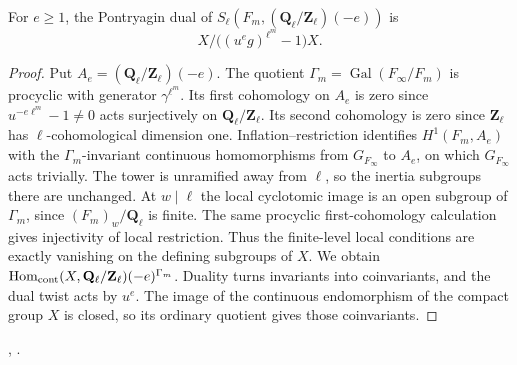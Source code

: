 \begin{lemma}\label{newcoh:desc}
For \(e\ge1\), the Pontryagin dual of
\(S_\ell(F_m,(\mathbf Q_\ell/\mathbf Z_\ell)(-e))\) is
\[
 X\big/\big((u^eg)^{\ell^m}-1\big)X .
\]
\end{lemma}
\begin{proof}
Put \(A_e=(\mathbf Q_\ell/\mathbf Z_\ell)(-e)\).
The quotient \(\Gamma_m=\operatorname{Gal}(F_\infty/F_m)\) is
procyclic with generator \(\gamma^{\ell^m}\). Its first cohomology on
\(A_e\) is zero since \(u^{-e\ell^m}-1\ne0\) acts surjectively on
\(\mathbf Q_\ell/\mathbf Z_\ell\). Its second cohomology is zero since
\(\mathbf Z_\ell\) has \(\ell\)-cohomological dimension one.
Inflation--restriction identifies \(H^1(F_m,A_e)\) with the
\(\Gamma_m\)-invariant continuous homomorphisms from \(G_{F_\infty}\)
to \(A_e\), on which \(G_{F_\infty}\) acts trivially.
The tower is unramified away from \(\ell\), so the inertia subgroups
there are unchanged. At \(w\mid\ell\) the local cyclotomic image is an
open subgroup of \(\Gamma_m\), since \((F_m)_w/\mathbf Q_\ell\)
is finite. The same procyclic first-cohomology calculation gives
injectivity of local restriction. Thus the finite-level local
conditions are exactly vanishing on the defining subgroups of \(X\).
We obtain \(\operatorname{Hom}_{\rm cont}(X,\mathbf Q_\ell/
\mathbf Z_\ell)(-e)^{\Gamma_m}\). Duality turns invariants into
coinvariants, and the dual twist acts by \(u^e\). The image of the
continuous endomorphism of the compact group \(X\) is closed, so its
ordinary quotient gives those coinvariants.
\end{proof}
\noindent
{},
.

